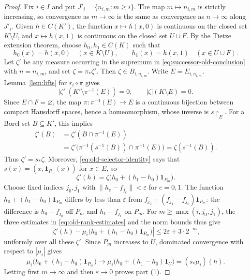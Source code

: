 \documentclass[a4paper,11pt]{amsart}
\theoremstyle{plain}
\theoremstyle{definition}
\theoremstyle{remark}
\newcommand{\one}{\mathbf 1}
\newcommand{\eps}{\varepsilon}
\newcommand{\restr}[1]{{\restriction_{#1}}}
\numberwithin{equation}{section}
\begin{document}
\begin{proof}
Fix $i\in I$ and put $J'_i=\{n_{i,m}:m\geqslant i\}$.
The map $m\mapsto n_{i,m}$ is strictly increasing, so convergence
as $m\to\infty$ is the same as convergence as $n\to\infty$ along $J'_i$.
Given $h\in C(K')$, the function $x\mapsto h(x,0)$ is continuous
on the closed set $K\setminus U$, and $x\mapsto h(x,1)$ is continuous
on the closed set $U\cup F$. By the Tietze extension theorem, choose
$h_0,h_1\in C(K)$ such that
\[
 h_0(x)=h(x,0)\quad(x\in K\setminus U),\qquad
 h_1(x)=h(x,1)\quad(x\in U\cup F).
\]
Let $\zeta'$ be any measure occurring in the supremum in
\eqref{eq:successor-old-conclusion} with $n=n_{i,m}$, and set
$\zeta=\pi_*\zeta'$. Then $\zeta\in B_{i,n_{i,m}}$.
Write $E=E_{i,n_{i,m}}$. Lemma~\ref{lem:lifts} for
$r_i\circ\pi$ gives
\[
 |\zeta'|(K'\setminus\pi^{-1}(E))=0,
 \qquad |\zeta|(K\setminus E)=0.
\]
Since $E\cap F=\varnothing$, the map
$\pi:\pi^{-1}(E)\to E$ is a continuous bijection between compact
Hausdorff spaces, hence a homeomorphism, whose inverse is $s\restr{E}$.
For a Borel set $B\subseteq K'$, this implies
\[
 \begin{split}
 \zeta'(B)
 &=\zeta'(B\cap\pi^{-1}(E))\\
 &=\zeta'\bigl(\pi^{-1}(s^{-1}(B))\cap\pi^{-1}(E)\bigr)
 =\zeta(s^{-1}(B)).
 \end{split}
\]
Thus $\zeta'=s_*\zeta$. Moreover, \eqref{eq:old-selector-identity}
says that $s(x)=(x,\one_{P_m}(x))$ for $x\in E$, so
\[
 \zeta'(h)=\zeta\bigl(h_0+(h_1-h_0)\one_{P_m}\bigr).
\]
Choose fixed indices $j_0,j_1$ with $\|h_e-f_{j_e}\|<\eps$ for $e=0,1$.
The function $h_0+(h_1-h_0)\one_{P_m}$ differs by less than $\eps$
from $f_{j_0}+(f_{j_1}-f_{j_0})\one_{P_m}$: the difference is
$h_0-f_{j_0}$ off $P_m$ and $h_1-f_{j_1}$ on $P_m$.
For $m\geqslant\max(i,j_0,j_1)$, the three estimates in
\eqref{eq:old-rank-estimates} and the norm bounds thus give
\[
 \left|\zeta'(h)-
 \mu_i\bigl(h_0+(h_1-h_0)\one_{P_m}\bigr)\right|
 \leqslant2\eps+3\cdot2^{-m},
\]
uniformly over all these $\zeta'$.
Since $P_m$ increases to $U$, dominated convergence with respect to
$|\mu_i|$ gives
\[
 \mu_i\bigl(h_0+(h_1-h_0)\one_{P_m}\bigr)
 \longrightarrow\mu_i\bigl(h_0+(h_1-h_0)\one_U\bigr)
 =(s_*\mu_i)(h).
\]
Letting first $m\to\infty$ and then $\eps\to0$ proves part (1).


\end{proof}
\end{document}
